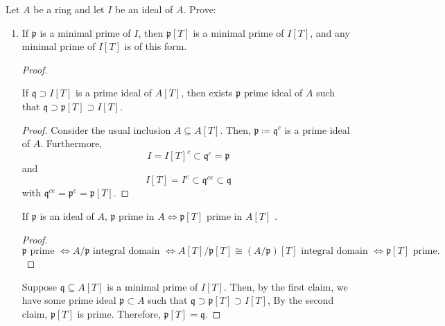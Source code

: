\begin{problem}
    Let $A$ be a ring and let $I$ be an ideal of $A$.
    Prove:
    \begin{enumerate}[label=(\theproblem.\arabic*),ref=\theproblem.\arabic*]

        \item If $\mathfrak{p}$ is a minimal prime of $I$, then $\mathfrak{p}[T]$ is a minimal prime of $I[T]$, and any minimal prime of $I[T]$ is of this form.
        \begin{sol}

            \begin{proof}

                \begin{claim}
                    If $\mathfrak{q} \supset I[T]$ is a prime ideal of $A[T]$, then exists $\mathfrak{p}$ prime ideal of $A$ such that
                    $\mathfrak{q} \supset \mathfrak{p}[T] \supset I[T]$.
                     \begin{proof}
                        Consider the usual inclusion $A \subseteq A[T]$.
                        Then,
                        $\mathfrak{p} \coloneqq \mathfrak{q}^{c}$ is a prime ideal of $A$.
                        Furthermore,
                        \[I = I[T]^c \subset \mathfrak{q}^c = \mathfrak{p}\]
                        and
                        \[I[T] = I^e \subset \mathfrak{q}^{ce} \subset \mathfrak{q}\]
                        with $\mathfrak{q}^{ce}=\mathfrak{p}^e = \mathfrak{p}[T]$.
                     \end{proof}
                \end{claim}

                \begin{claim}
                    If $\mathfrak{p}$ is an ideal of $A$, $\mathfrak{p}$ prime in $A \Leftrightarrow \mathfrak{p}[T]$ prime in $A[T]$ .
                    \begin{proof}
                        $\mathfrak{p} \text{ prime } \Leftrightarrow
                        A / \mathfrak{p} \text{ integral domain }
                        \Leftrightarrow A[T]/\mathfrak{p}[T] \cong (A / \mathfrak{p})[T] \text{ integral domain }
                        \Leftrightarrow \mathfrak{p}[T] \text{ prime.}$
                    \end{proof}
                \end{claim}



                Suppose $\mathfrak{q} \subseteq A[T]$ is a minimal prime of $I[T]$.
                Then, by the first claim, we have some prime ideal $\mathfrak{p} \subset A$ such that
                $\mathfrak{q} \supset \mathfrak{p}[T] \supset I[T]$,
                By the second claim, $\mathfrak{p}[T]$ is prime.
                Therefore, $\mathfrak{p}[T] = \mathfrak{q}$.


\end{proof}
\end{sol}
\end{enumerate}
\end{problem}
